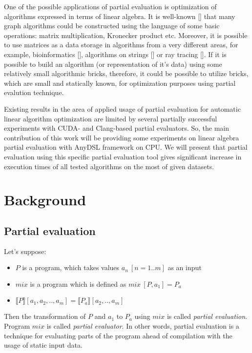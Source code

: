 \documentclass[conference]{IEEEtran}
\begin{document}
One of the possible applications of partial evaluation is optimization of algorithms expressed in terms of linear algebra. It is well-known [] that many graph algorithms could be constructed using the language of some basic operations: matrix multiplication, Kronecker product etc. Moreover, it is possible to use matrices as a data storage in algorithms from a very different areas, for example, bioinformatics [], algorithms on strings [] or ray tracing []. If it is possible to build an algorithm (or representation of it's data) using some relatively small algorithmic bricks, therefore, it could be possible to utilize bricks, which are small and statically known, for optimization purposes using partial evalution technique.

Existing results in the area of applied usage of partial evaluation for automatic linear algorithm optimization are limited by several partially successful experiments with CUDA- and Clang-based partial evaluators. So, the main contribution of this work  will be providing some experiments on linear algebra partial evaluation with AnyDSL framework on CPU. We will present that partial evaluation using this specific partial evaluation tool gives significant increase in execution times of all tested algorithms on the most of given datasets.


\section{Background}

\subsection{Partial evaluation}

Let's suppose:

\begin{itemize}
	\item $P$ is a program, which takes values $a_n\ [n=1..m]$ as an input
	\item $mix$ is a program which is defined as $mix\ [P, a_1] = P_a$
	\item $\llbracket P \rrbracket [a_1, a_2, .., a_m] = \llbracket P_a \rrbracket [a_2, .., a_m]$
\end{itemize}
Then the transformation of $P$ and $a_1$ to $P_a$ using $mix$ is called \textit{partial evaluation}. Program $mix$ is called \textit{partial evaluator}. In other words, partial evaluation is a technique for evaluating parts of the program ahead of compilation with the usage of static input data.
\end{document}
